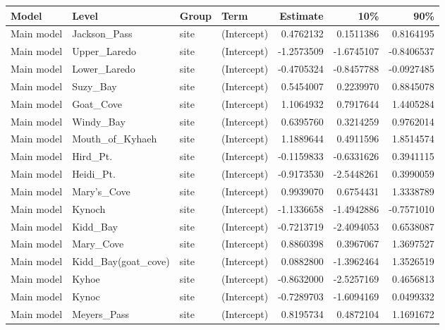 \begin{longtable}
\centering
\caption{Random Effects with 90 \% Credible Intervals for Bayesian
    generalized linear model estimating the number of lice on fish per year.
    This model uses all years of the timeseries and the response
    variable is \textit{L. salmonis} lice of all stages}
\centering
\begin{tabular}[t]{llllrrr}
\toprule
Model & Level & Group & Term & Estimate & 10\% & 90\%\\
\midrule
Main model & Jackson_Pass & site & (Intercept) & 0.4762132 & 0.1511386 & 0.8164195\\
Main model & Upper_Laredo & site & (Intercept) & -1.2573509 & -1.6745107 & -0.8406537\\
Main model & Lower_Laredo & site & (Intercept) & -0.4705324 & -0.8457788 & -0.0927485\\
Main model & Suzy_Bay & site & (Intercept) & 0.5454007 & 0.2239970 & 0.8845078\\
Main model & Goat_Cove & site & (Intercept) & 1.1064932 & 0.7917644 & 1.4405284\\
\addlinespace
Main model & Windy_Bay & site & (Intercept) & 0.6395760 & 0.3214259 & 0.9762014\\
Main model & Mouth_of_Kyhaeh & site & (Intercept) & 1.1889644 & 0.4911596 & 1.8514574\\
Main model & Hird_Pt. & site & (Intercept) & -0.1159833 & -0.6331626 & 0.3941115\\
Main model & Heidi_Pt. & site & (Intercept) & -0.9173530 & -2.5448261 & 0.3990059\\
Main model & Mary's_Cove & site & (Intercept) & 0.9939070 & 0.6754431 & 1.3338789\\
\addlinespace
Main model & Kynoch & site & (Intercept) & -1.1336658 & -1.4942886 & -0.7571010\\
Main model & Kidd_Bay & site & (Intercept) & -0.7213719 & -2.4094053 & 0.6538087\\
Main model & Mary_Cove & site & (Intercept) & 0.8860398 & 0.3967067 & 1.3697527\\
Main model & Kidd_Bay(goat_cove) & site & (Intercept) & 0.0882800 & -1.3962464 & 1.3526519\\
Main model & Kyhoe & site & (Intercept) & -0.8632000 & -2.5257169 & 0.4656813\\
\addlinespace
Main model & Kynoc & site & (Intercept) & -0.7289703 & -1.6094169 & 0.0499332\\
Main model & Meyers_Pass & site & (Intercept) & 0.8195734 & 0.4872104 & 1.1691672\\

\end{tabular}
\end{longtable}
